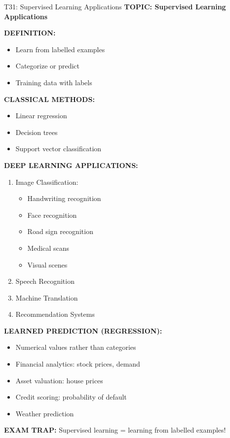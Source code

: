 \documentclass[8pt]{beamer}
\begin{document}
	\begin{frame}{T31: Supervised Learning Applications}
		\fontsize{6.5}{7.5}\selectfont
		\textbf{TOPIC: Supervised Learning Applications}
		
		\vspace{0.1cm}
		\textbf{DEFINITION:}
		\begin{itemize}
			\item Learn from labelled examples
			\item Categorize or predict
			\item Training data with labels
		\end{itemize}
		
		\vspace{0.1cm}
		\textbf{CLASSICAL METHODS:}
		\begin{itemize}
			\item Linear regression
			\item Decision trees
			\item Support vector classification
		\end{itemize}
		
		\vspace{0.1cm}
		\textbf{DEEP LEARNING APPLICATIONS:}
		\begin{enumerate}
			\item \textcolor{myblue}{Image Classification:}
			\begin{itemize}
				\item Handwriting recognition
				\item Face recognition
				\item Road sign recognition
				\item Medical scans
				\item Visual scenes
			\end{itemize}
			\item \textcolor{myblue}{Speech Recognition}
			\item \textcolor{myblue}{Machine Translation}
			\item \textcolor{myblue}{Recommendation Systems}
		\end{enumerate}
		
		\vspace{0.1cm}
		\textbf{LEARNED PREDICTION (REGRESSION):}
		\begin{itemize}
			\item Numerical values rather than categories
			\item Financial analytics: stock prices, demand
			\item Asset valuation: house prices
			\item Credit scoring: probability of default
			\item Weather prediction
		\end{itemize}
		
		\textcolor{myred}{\textbf{EXAM TRAP:}} Supervised learning = \textcolor{myblue}{learning from labelled examples}!
	\end{frame}
	
\end{document}

